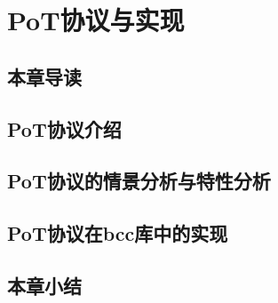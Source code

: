 \chapter{PoT协议与实现}

\section{本章导读}

\section{PoT协议介绍}

\section{PoT协议的情景分析与特性分析}

\section{PoT协议在bcc库中的实现}

\section{本章小结}
